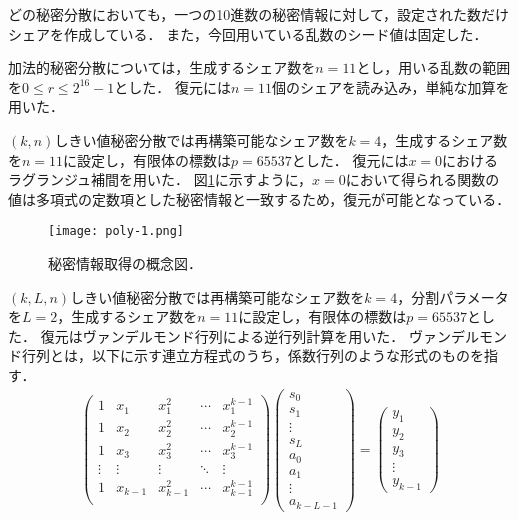 \documentclass[10pt, a4paper, titlepage]{jsreport}
\begin{document}
	どの秘密分散においても，一つの10進数の秘密情報に対して，設定された数だけシェアを作成している．
	また，今回用いている乱数のシード値は固定した．

	加法的秘密分散については，生成するシェア数を$n=11$とし，用いる乱数の範囲を$0{\leq}r{\leq}2^{16}-1$とした．
	復元には$n=11$個のシェアを読み込み，単純な加算を用いた．

	$(k,n)$しきい値秘密分散では再構築可能なシェア数を$k=4$，生成するシェア数を$n=11$に設定し，有限体の標数は$p=65537$とした．
	復元には$x=0$におけるラグランジュ補間を用いた．
	図\ref{poly}に示すように，$x=0$において得られる関数の値は多項式の定数項とした秘密情報と一致するため，復元が可能となっている．

	\begin{figure}[ht]
		\begin{center}
			\texttt{[image: poly-1.png]}
			\caption{秘密情報取得の概念図．}
			\label{poly}
		\end{center}
	\end{figure}

	$(k,L,n)$しきい値秘密分散では再構築可能なシェア数を$k=4$，分割パラメータを$L=2$，生成するシェア数を$n=11$に設定し，有限体の標数は$p=65537$とした．
	復元はヴァンデルモンド行列による逆行列計算を用いた．
	ヴァンデルモンド行列とは，以下に示す連立方程式のうち，係数行列のような形式のものを指す．
	\begin{eqnarray*}
		\left(
		\begin{array}{ccccc}
			1 & x_1 & x_1^2 & \cdots & x_1^{k-1} \\
			1 & x_2 & x_2^2 & \cdots & x_2^{k-1} \\
			1 & x_3 & x_3^2 & \cdots & x_3^{k-1} \\
			\vdots & \vdots & \vdots & \ddots & \vdots \\
			1 & x_{k-1} & x_{k-1}^2 & \cdots & x_{k-1}^{k-1} \\
		\end{array}
		\right)
		\left(
		\begin{array}{cccccccc}
			s_0 \\
			s_1 \\
			\vdots \\
			s_L \\
			a_0 \\
			a_1 \\
			\vdots \\
			a_{k-L-1}
		\end{array}
		\right)
		=
		\left(
		\begin{array}{ccccc}
			y_1 \\
			y_2 \\
			y_3 \\
			\vdots \\
			y_{k-1}
		\end{array}
		\right)
	\end{eqnarray*}
\end{document}
